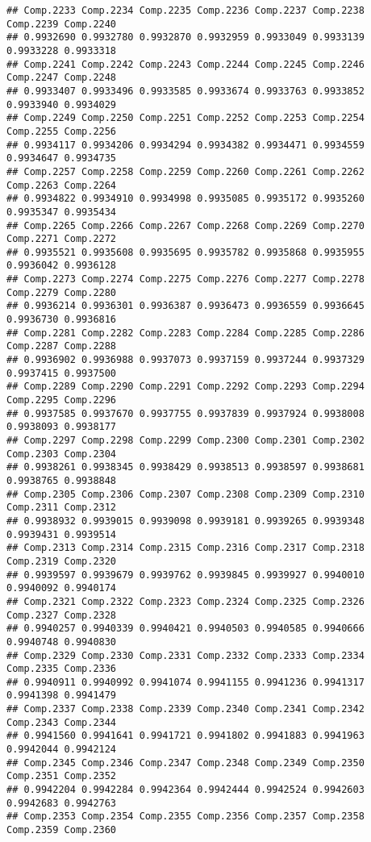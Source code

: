 \documentclass[
]{article}
\begin{document}
\begin{verbatim}
## Comp.2233 Comp.2234 Comp.2235 Comp.2236 Comp.2237 Comp.2238 Comp.2239 Comp.2240 
## 0.9932690 0.9932780 0.9932870 0.9932959 0.9933049 0.9933139 0.9933228 0.9933318 
## Comp.2241 Comp.2242 Comp.2243 Comp.2244 Comp.2245 Comp.2246 Comp.2247 Comp.2248 
## 0.9933407 0.9933496 0.9933585 0.9933674 0.9933763 0.9933852 0.9933940 0.9934029 
## Comp.2249 Comp.2250 Comp.2251 Comp.2252 Comp.2253 Comp.2254 Comp.2255 Comp.2256 
## 0.9934117 0.9934206 0.9934294 0.9934382 0.9934471 0.9934559 0.9934647 0.9934735 
## Comp.2257 Comp.2258 Comp.2259 Comp.2260 Comp.2261 Comp.2262 Comp.2263 Comp.2264 
## 0.9934822 0.9934910 0.9934998 0.9935085 0.9935172 0.9935260 0.9935347 0.9935434 
## Comp.2265 Comp.2266 Comp.2267 Comp.2268 Comp.2269 Comp.2270 Comp.2271 Comp.2272 
## 0.9935521 0.9935608 0.9935695 0.9935782 0.9935868 0.9935955 0.9936042 0.9936128 
## Comp.2273 Comp.2274 Comp.2275 Comp.2276 Comp.2277 Comp.2278 Comp.2279 Comp.2280 
## 0.9936214 0.9936301 0.9936387 0.9936473 0.9936559 0.9936645 0.9936730 0.9936816 
## Comp.2281 Comp.2282 Comp.2283 Comp.2284 Comp.2285 Comp.2286 Comp.2287 Comp.2288 
## 0.9936902 0.9936988 0.9937073 0.9937159 0.9937244 0.9937329 0.9937415 0.9937500 
## Comp.2289 Comp.2290 Comp.2291 Comp.2292 Comp.2293 Comp.2294 Comp.2295 Comp.2296 
## 0.9937585 0.9937670 0.9937755 0.9937839 0.9937924 0.9938008 0.9938093 0.9938177 
## Comp.2297 Comp.2298 Comp.2299 Comp.2300 Comp.2301 Comp.2302 Comp.2303 Comp.2304 
## 0.9938261 0.9938345 0.9938429 0.9938513 0.9938597 0.9938681 0.9938765 0.9938848 
## Comp.2305 Comp.2306 Comp.2307 Comp.2308 Comp.2309 Comp.2310 Comp.2311 Comp.2312 
## 0.9938932 0.9939015 0.9939098 0.9939181 0.9939265 0.9939348 0.9939431 0.9939514 
## Comp.2313 Comp.2314 Comp.2315 Comp.2316 Comp.2317 Comp.2318 Comp.2319 Comp.2320 
## 0.9939597 0.9939679 0.9939762 0.9939845 0.9939927 0.9940010 0.9940092 0.9940174 
## Comp.2321 Comp.2322 Comp.2323 Comp.2324 Comp.2325 Comp.2326 Comp.2327 Comp.2328 
## 0.9940257 0.9940339 0.9940421 0.9940503 0.9940585 0.9940666 0.9940748 0.9940830 
## Comp.2329 Comp.2330 Comp.2331 Comp.2332 Comp.2333 Comp.2334 Comp.2335 Comp.2336 
## 0.9940911 0.9940992 0.9941074 0.9941155 0.9941236 0.9941317 0.9941398 0.9941479 
## Comp.2337 Comp.2338 Comp.2339 Comp.2340 Comp.2341 Comp.2342 Comp.2343 Comp.2344 
## 0.9941560 0.9941641 0.9941721 0.9941802 0.9941883 0.9941963 0.9942044 0.9942124 
## Comp.2345 Comp.2346 Comp.2347 Comp.2348 Comp.2349 Comp.2350 Comp.2351 Comp.2352 
## 0.9942204 0.9942284 0.9942364 0.9942444 0.9942524 0.9942603 0.9942683 0.9942763 
## Comp.2353 Comp.2354 Comp.2355 Comp.2356 Comp.2357 Comp.2358 Comp.2359 Comp.2360 

\end{verbatim}
\end{document}
